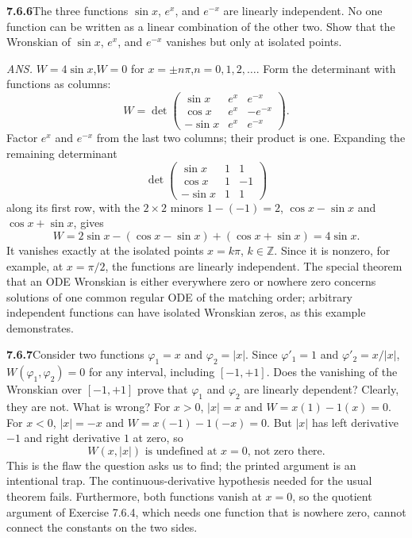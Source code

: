 \par\bigskip
\noindent\textbf{7.6.6}\quad The three functions $\sin x$, $e^{x}$, and
$e^{-x}$ are linearly independent. No one function can be written as a linear
combination of the other two. Show that the Wronskian of $\sin x$, $e^{x}$,
and $e^{-x}$ vanishes but only at isolated points.
\par\nobreak\hfill\emph{ANS.}\enspace
$W=4\sin x$,\quad$W=0$ for $x=\pm n\pi$,\quad$n=0,1,2,\ldots$.
\solution
Form the determinant with functions as columns:
\[
W=\det\begin{pmatrix}
\sin x&e^x&e^{-x}\\\cos x&e^x&-e^{-x}\\-\sin x&e^x&e^{-x}
\end{pmatrix}.
\]
Factor $e^x$ and $e^{-x}$ from the last two columns; their product is
one. Expanding the remaining determinant
\[
\det\begin{pmatrix}
\sin x&1&1\\\cos x&1&-1\\-\sin x&1&1
\end{pmatrix}
\]
along its first row, with the $2\times2$ minors $1-(-1)=2$,
$\cos x-\sin x$ and $\cos x+\sin x$, gives
\[
W=2\sin x-(\cos x-\sin x)+(\cos x+\sin x)
=\boxed{4\sin x}.
\]
It vanishes exactly at the isolated points $x=k\pi$, $k\in\mathbb Z$.
Since it is nonzero, for example, at $x=\pi/2$, the functions are
linearly independent. The special theorem that an ODE Wronskian is
either everywhere zero or nowhere zero concerns solutions of one common
regular ODE of the matching order; arbitrary independent functions can
have isolated Wronskian zeros, as this example demonstrates.

\par\bigskip
\noindent\textbf{7.6.7}\quad Consider two functions $\varphi_{1}=x$ and
$\varphi_{2}=|x|$. Since $\varphi'_{1}=1$ and $\varphi'_{2}=x/|x|$,
$W(\varphi_{1},\varphi_{2})=0$ for any interval, including $[-1,+1]$. Does the
vanishing of the Wronskian over $[-1,+1]$ prove that $\varphi_{1}$ and
$\varphi_{2}$ are linearly dependent? Clearly, they are not. What is wrong?
\solution
For $x>0$, $|x|=x$ and $W=x(1)-1(x)=0$. For $x<0$, $|x|=-x$ and
$W=x(-1)-1(-x)=0$. But $|x|$ has left derivative $-1$ and right
derivative $1$ at zero, so
\[
\boxed{\text{$W(x,|x|)$ is undefined at $x=0$, not zero there.}}
\]
This is the flaw the question asks us to find; the printed argument is
an intentional trap. The continuous-derivative hypothesis needed for the
usual theorem fails.
Furthermore, both functions vanish at $x=0$, so the quotient argument of
Exercise 7.6.4, which needs one function that is nowhere zero, cannot
connect the constants on the two sides.

